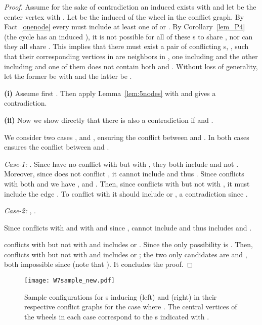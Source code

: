 \documentclass[final]{dmtcs-episciences}
\newcommand\mar[1]{\textcolor{black}{#1}}
\begin{document}
\begin{proof}
Assume for the sake of contradiction an induced  exists with   and 
let  be the center vertex with . Let 
be the induced  of the wheel  in the conflict graph.
By Fact~\ref{onenode}
every  must include at least one of 
 or . By Corollary~\ref{lem_P4} (the cycle  has an induced ), it is not possible for all of \mar{these s} to share 
, nor can they all share . This implies that there must exist 
a pair of conflicting s, , such that their corresponding vertices in  are neighbors in , one including  and the other including  and one of them does not contain both  and . 
Without loss of generality, let the former be   with  and the latter be . 



\textbf{(i)}
Assume first . Then apply Lemma~\ref{lem:5nodes} with  and  gives a contradiction.

\textbf{(ii)} Now we show directly that there is also a contradiction if  and . 

We consider two cases ,  and ,  ensuring the conflict between  and . In both cases  ensures the conflict between  and .

 \emph{Case-1:} . Since  have no conflict with  but with , they both include  and not . Moreover, since  does not conflict  , it cannot include  and thus .  Since    conflicts with both  and  we have ,  and . Then, since  conflicts with 
but not with , it must include the edge . To conflict with  it should include  or , a contradiction since .


 \emph{Case-2:} , .

 Since  conflicts with  and with  and since ,  cannot include  and thus includes  and  .

 conflicts with  but not with  and includes   or .
Since  the only possibility is 
. 
Then,  conflicts with  but not with  and includes   or ; the two only candidates are  and , both impossible since  (note that ). It concludes the proof.
\end{proof}

\begin{figure}[t]	   
\begin{center}	   
\texttt{[image: W7sample\_new.pdf]} 
\caption{\sf Sample configurations for s inducing  (left) and  (right) in their respective 
conflict graphs
for the case where .
The central vertices of the wheels in each case correspond to the s  
indicated with .
} 
\label{w7sample}	   
\end{center}	   
\end{figure}  
\end{document}
